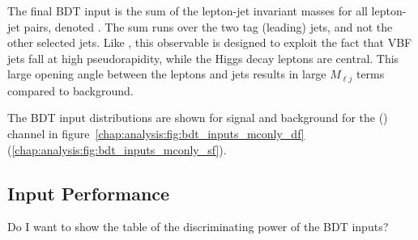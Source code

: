 The final BDT input is the sum of the lepton-jet invariant masses for
all lepton-jet pairs, denoted \SumMlj. The sum runs over the two tag (leading)
jets, and not the other selected jets. Like \lepEtaCent, this
observable is designed to exploit the fact that VBF jets fall at high
pseudorapidity, while the Higgs decay leptons are central. This large
opening angle between the leptons and jets results in large $M_{\ell
j}$ terms compared to background. 

The BDT input distributions are shown for signal and background for
the \emme (\eemm) channel in figure~\ref{chap:analysis:fig:bdt_inputs_mconly_df} (\ref{chap:analysis:fig:bdt_inputs_mconly_sf}). 

\subsection{Input Performance}

Do I want to show the table of the discriminating power of the BDT inputs?


